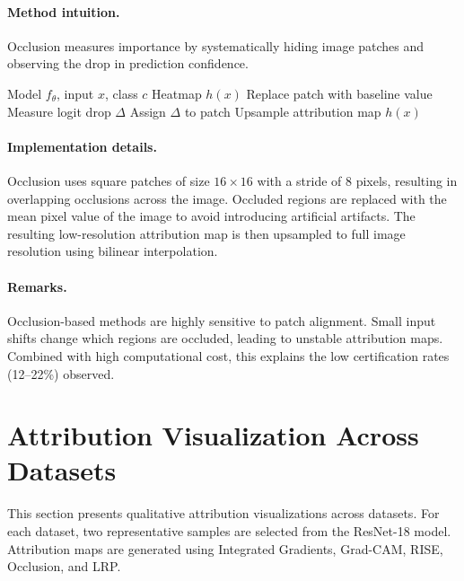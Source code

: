 \documentclass[11pt]{article}
\begin{document}
\paragraph{Method intuition.}
Occlusion measures importance by systematically hiding image patches and observing the drop in prediction confidence.

\begin{algorithm}[H]
\caption{Occlusion}
\label{alg:occlusion}
\begin{algorithmic}[1]
\REQUIRE Model $f_\theta$, input $x$, class $c$
\ENSURE Heatmap $h(x)$
    \STATE Replace patch with baseline value
    \STATE Measure logit drop $\Delta$
    \STATE Assign $\Delta$ to patch
\ENDFOR
\STATE Upsample attribution map
\RETURN $h(x)$
\end{algorithmic}
\end{algorithm}

\paragraph{Implementation details.}
Occlusion uses square patches of size $16 \times 16$ with a stride of 8 pixels, resulting in overlapping occlusions across the image. Occluded regions are replaced with the mean pixel value of the image to avoid introducing artificial artifacts. The resulting low-resolution attribution map is then upsampled to full image resolution using bilinear interpolation.

\paragraph{Remarks.}
Occlusion-based methods are highly sensitive to patch alignment. Small input shifts change which regions are occluded, leading to unstable attribution maps. Combined with high computational cost, this explains the low certification rates (12--22\%) observed.


\section{Attribution Visualization Across Datasets}

This section presents qualitative attribution visualizations across datasets. For each dataset, two representative samples are selected from the ResNet-18 model. Attribution maps are generated using Integrated Gradients, Grad-CAM, RISE, Occlusion, and LRP.
\end{document}
